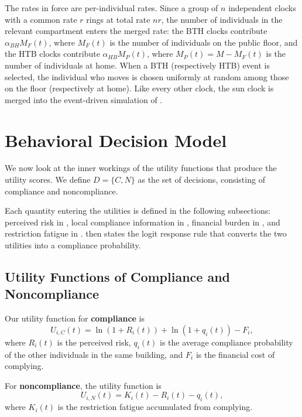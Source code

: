 \documentclass[11pt]{article}
\theoremstyle{definition}
\theoremstyle{plain}
\begin{document}
The rates in force are per-individual rates. Since a group of $n$ independent clocks with a common rate $r$ rings at total rate $nr$, the number of individuals in the relevant compartment enters the merged rate: the BTH clocks contribute $\alpha_{BH}M_F(t)$, where $M_F(t)$ is the number of individuals on the public floor, and the HTB clocks contribute $\alpha_{HB}M_P(t)$, where $M_P(t)=M-M_F(t)$ is the number of individuals at home. When a BTH (respectively HTB) event is selected, the individual who moves is chosen uniformly at random among those on the floor (respectively at home). Like every other clock, the sun clock is merged into the event-driven simulation of .

\section{Behavioral Decision Model}
\label{sec:behavioral}

We now look at the inner workings of the utility functions that produce the utility scores. We define $D=\{C,N\}$ as the set of decisions, consisting of compliance and noncompliance.

Each quantity entering the utilities is defined in the following subsections: perceived risk in , local compliance information in , financial burden in , and restriction fatigue in .  then states the logit response rule that converts the two utilities into a compliance probability.


\subsection{Utility Functions of Compliance and Noncompliance}
\label{sec:utility}

Our utility function for \textbf{compliance} is
\begin{equation}\label{eq:3}
  U_{i,C}(t) = \ln(1+ R_i(t)) + \ln(1+q_i(t)) - F_i ,
\end{equation}
where $R_i(t)$ is the perceived risk, $q_i(t)$ is the average compliance probability of the other individuals in the same building, and $F_i$ is the financial cost of complying.

For \textbf{noncompliance}, the utility function is
\begin{equation}\label{eq:4}
U_{i,N}(t) = K_i(t) - R_i(t) - q_i(t),
\end{equation}
where $K_i(t)$ is the restriction fatigue accumulated from complying.
\end{document}
